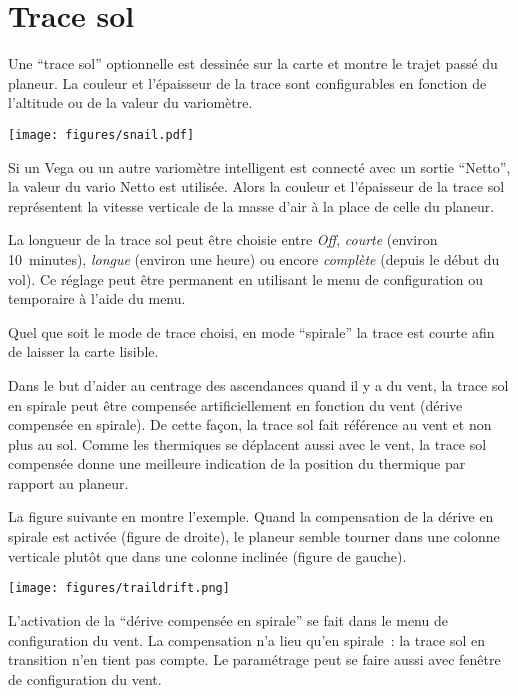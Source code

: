 \section{Trace sol}\label{sec:trail}

Une ``trace sol'' optionnelle est dessinée sur la carte et montre le trajet passé du planeur.
La couleur et l'épaisseur de la trace sont configurables en fonction de l'altitude ou de la valeur du variomètre.

\begin{center}
\texttt{[image: figures/snail.pdf]}
\end{center}

Si un Vega ou un autre variomètre intelligent est connecté avec un sortie ``Netto'',
la valeur du vario Netto est utilisée. Alors la couleur et l'épaisseur de la trace sol
représentent la vitesse verticale de la masse d'air à la place de celle du planeur.

La longueur de la trace sol peut être choisie entre \emph{Off}, \emph{courte} (environ 10~minutes),
\emph{longue} (environ une heure) ou encore \emph{complète} (depuis le début du vol).
Ce réglage peut être permanent en utilisant le menu de configuration  ou temporaire à l'aide du menu.

Quel que soit  le mode de trace choisi, en mode ``spirale'' la trace est courte afin de laisser la carte lisible.

Dans le but d'aider au centrage des ascendances quand il y a du vent, la trace sol en spirale
peut être compensée artificiellement en fonction du vent (dérive compensée en spirale).
De cette façon, la trace sol fait référence au vent et non plus au sol. Comme les thermiques
se déplacent aussi avec le vent, la trace sol compensée donne une meilleure
indication de la position du thermique par rapport au planeur.

La figure suivante en montre l'exemple. Quand la compensation de la dérive en spirale est activée
(figure de droite), le planeur semble tourner dans une colonne verticale plutôt que dans une colonne inclinée (figure de gauche).

\begin{center}
\texttt{[image: figures/traildrift.png]}
\end{center}

L'activation de la ``dérive compensée en spirale'' se fait dans le
menu de configuration du vent.  La compensation n'a lieu qu'en spirale~: la trace sol en transition n'en tient pas compte.
Le paramétrage peut se faire aussi avec fenêtre de configuration du vent.

